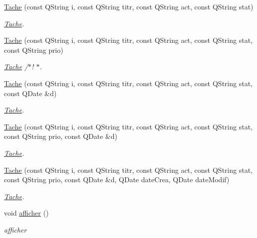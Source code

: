 \begin{DoxyCompactItemize}
\hyperlink{class_tache_ab029daf34bc009bd046777fbdd716e37}{Tache} (const Q\+String i, const Q\+String titr, const Q\+String act, const Q\+String stat)
\begin{DoxyCompactList}\small\item\em \hyperlink{class_tache}{Tache}. \end{DoxyCompactList}\item 
\hyperlink{class_tache_a04ed13af47af4d26389971ba6d87a885}{Tache} (const Q\+String i, const Q\+String titr, const Q\+String act, const Q\+String stat, const Q\+String prio)
\begin{DoxyCompactList}\small\item\em \hyperlink{class_tache}{Tache} /$\ast$! $\ast$. \end{DoxyCompactList}\item 
\hyperlink{class_tache_a1b621faee01bbef3c45f2b3e04b59a34}{Tache} (const Q\+String i, const Q\+String titr, const Q\+String act, const Q\+String stat, const Q\+Date \&d)
\begin{DoxyCompactList}\small\item\em \hyperlink{class_tache}{Tache}. \end{DoxyCompactList}\item 
\hyperlink{class_tache_ac65becb46aa18bce8a02a0cfd1f6ad05}{Tache} (const Q\+String i, const Q\+String titr, const Q\+String act, const Q\+String stat, const Q\+String prio, const Q\+Date \&d)
\begin{DoxyCompactList}\small\item\em \hyperlink{class_tache}{Tache}. \end{DoxyCompactList}\item 
\hyperlink{class_tache_a954b676ba83e558be2dec9a690add0f3}{Tache} (const Q\+String i, const Q\+String titr, const Q\+String act, const Q\+String stat, const Q\+String prio, const Q\+Date \&d, Q\+Date date\+Crea, Q\+Date date\+Modif)
\begin{DoxyCompactList}\small\item\em \hyperlink{class_tache}{Tache}. \end{DoxyCompactList}\item 
\mbox{\label{class_tache_a38613f8c4295b1e9e8defae472b82bdd}} 
void \hyperlink{class_tache_a38613f8c4295b1e9e8defae472b82bdd}{afficher} ()
\begin{DoxyCompactList}\small\item\em afficher \end{DoxyCompactList}\end{DoxyCompactItemize}


